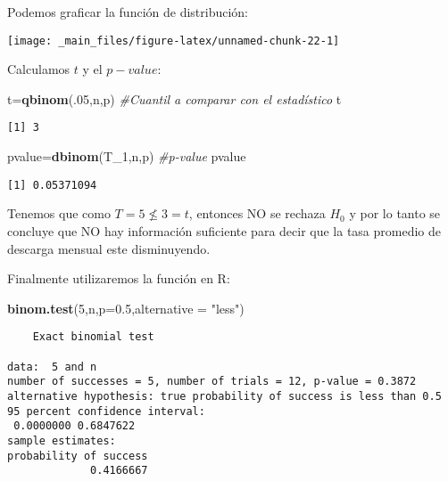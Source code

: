 \documentclass[
  a4paper,
  oneside,
  openany]{book}
\newenvironment{Shaded}{\begin{snugshade}}{\end{snugshade}}
\newcommand{\CommentTok}[1]{\textcolor[rgb]{0.56,0.35,0.01}{\textit{#1}}}
\newcommand{\DataTypeTok}[1]{\textcolor[rgb]{0.13,0.29,0.53}{#1}}
\newcommand{\DecValTok}[1]{\textcolor[rgb]{0.00,0.00,0.81}{#1}}
\newcommand{\FloatTok}[1]{\textcolor[rgb]{0.00,0.00,0.81}{#1}}
\newcommand{\KeywordTok}[1]{\textcolor[rgb]{0.13,0.29,0.53}{\textbf{#1}}}
\newcommand{\NormalTok}[1]{#1}
\newcommand{\StringTok}[1]{\textcolor[rgb]{0.31,0.60,0.02}{#1}}
\begin{document}
Podemos graficar la función de distribución:

\begin{center}\texttt{[image: \_main\_files/figure-latex/unnamed-chunk-22-1]} \end{center}

Calculamos \(t\) y el \(p-value\):

\begin{Shaded}
\begin{Highlighting}[]
\NormalTok{t=}\KeywordTok{qbinom}\NormalTok{(.}\DecValTok{05}\NormalTok{,n,p)       }\CommentTok{\#Cuantil a comparar con el estadístico}
\NormalTok{t}
\end{Highlighting}
\end{Shaded}

\begin{verbatim}
[1] 3
\end{verbatim}

\begin{Shaded}
\begin{Highlighting}[]
\NormalTok{pvalue=}\KeywordTok{dbinom}\NormalTok{(T\_}\DecValTok{1}\NormalTok{,n,p)  }\CommentTok{\#p{-}value}
\NormalTok{pvalue}
\end{Highlighting}
\end{Shaded}

\begin{verbatim}
[1] 0.05371094
\end{verbatim}

Tenemos que como \(T=5\nleq 3 =t\), entonces NO se rechaza \(H_0\) y por lo tanto se concluye que NO hay información suficiente para decir que la tasa promedio de descarga mensual este disminuyendo.

Finalmente utilizaremos la función en R:

\begin{Shaded}
\begin{Highlighting}[]
\KeywordTok{binom.test}\NormalTok{(}\DecValTok{5}\NormalTok{,n,}\DataTypeTok{p=}\FloatTok{0.5}\NormalTok{,}\DataTypeTok{alternative =} \StringTok{"less"}\NormalTok{)}
\end{Highlighting}
\end{Shaded}

\begin{verbatim}
    Exact binomial test

data:  5 and n
number of successes = 5, number of trials = 12, p-value = 0.3872
alternative hypothesis: true probability of success is less than 0.5
95 percent confidence interval:
 0.0000000 0.6847622
sample estimates:
probability of success 
             0.4166667 
\end{verbatim}
\end{document}
